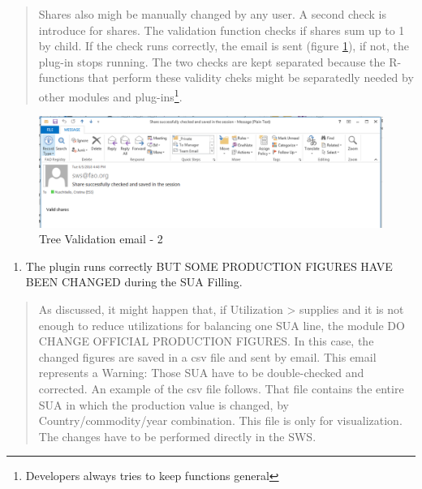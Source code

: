 \documentclass[]{article}
\providecommand{\tightlist}{%
  \setlength{\itemsep}{0pt}\setlength{\parskip}{0pt}}
\let\rmarkdownfootnote\footnote%
\def\footnote{\protect\rmarkdownfootnote}
\begin{document}
\begin{quote}
Shares also migh be manually changed by any user. A second check is
introduce for shares. The validation function checks if shares sum up to
1 by child. If the check runs correctly, the email is sent (figure
\ref{fig:f32}), if not, the plug-in stops running. The two checks are
kept separated because the R-functions that perform these validity cheks
might be separatedly needed by other modules and plug-ins\footnote{Developers
  always tries to keep functions general}.
\end{quote}

\begin{figure}[H]

{\centering \includegraphics[width=1\linewidth]{images/standPlugin/32_email2} 

}

\caption{\label{fig:f32}Tree Validation email - 2}\label{fig:f32}
\end{figure}

\begin{enumerate}
\def\labelenumi{\arabic{enumi}.}
\setcounter{enumi}{2}
\tightlist
\item
  The plugin runs correctly BUT SOME PRODUCTION FIGURES HAVE BEEN
  CHANGED during the SUA Filling.
\end{enumerate}

\begin{quote}
As discussed, it might happen that, if Utilization \textgreater{}
supplies and it is not enough to reduce utilizations for balancing one
SUA line, the module DO CHANGE OFFICIAL PRODUCTION FIGURES. In this
case, the changed figures are saved in a csv file and sent by email.
This email represents a Warning: Those SUA have to be double-checked and
corrected. An example of the csv file follows. That file contains the
entire SUA in which the production value is changed, by
Country/commodity/year combination. This file is only for visualization.
The changes have to be performed directly in the SWS.
\end{quote}
\end{document}
